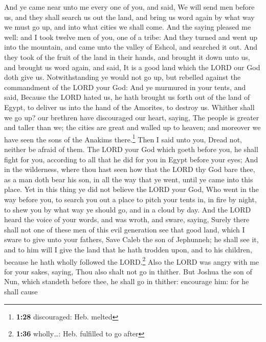  And ye came near unto me every one of you, and said, We
will send men before us, and they shall search us out the land, and
bring us word again by what way we must go up, and into what cities we
shall come.  And the saying pleased me well: and I took
twelve men of you, one of a tribe:  And they turned and
went up into the mountain, and came unto the valley of Eshcol, and
searched it out.  And they took of the fruit of the land
in their hands, and brought it down unto us, and brought us word again,
and said, It is a good land which the LORD our God doth give us.
 Notwithstanding ye would not go up, but rebelled against
the commandment of the LORD your God:  And ye murmured in
your tents, and said, Because the LORD hated us, he hath brought us
forth out of the land of Egypt, to deliver us into the hand of the
Amorites, to destroy us.  Whither shall we go up? our
brethren have discouraged our heart, saying, The people is greater and
taller than we; the cities are great and walled up to heaven; and
moreover we have seen the sons of the Anakims there.\footnote{\textbf{1:28}
  discouraged: Heb. melted}  Then I said unto you, Dread
not, neither be afraid of them.  The LORD your God which
goeth before you, he shall fight for you, according to all that he did
for you in Egypt before your eyes;  And in the
wilderness, where thou hast seen how that the LORD thy God bare thee, as
a man doth bear his son, in all the way that ye went, until ye came into
this place.  Yet in this thing ye did not believe the
LORD your God,  Who went in the way before you, to search
you out a place to pitch your tents in, in fire by night, to shew you by
what way ye should go, and in a cloud by day.  And the
LORD heard the voice of your words, and was wroth, and sware, saying,
 Surely there shall not one of these men of this evil
generation see that good land, which I sware to give unto your fathers,
 Save Caleb the son of Jephunneh; he shall see it, and to
him will I give the land that he hath trodden upon, and to his children,
because he hath wholly followed the LORD.\footnote{\textbf{1:36}
  wholly\ldots: Heb. fulfilled to go after}  Also the
LORD was angry with me for your sakes, saying, Thou also shalt not go in
thither.  But Joshua the son of Nun, which standeth
before thee, he shall go in thither: encourage him: for he shall cause
